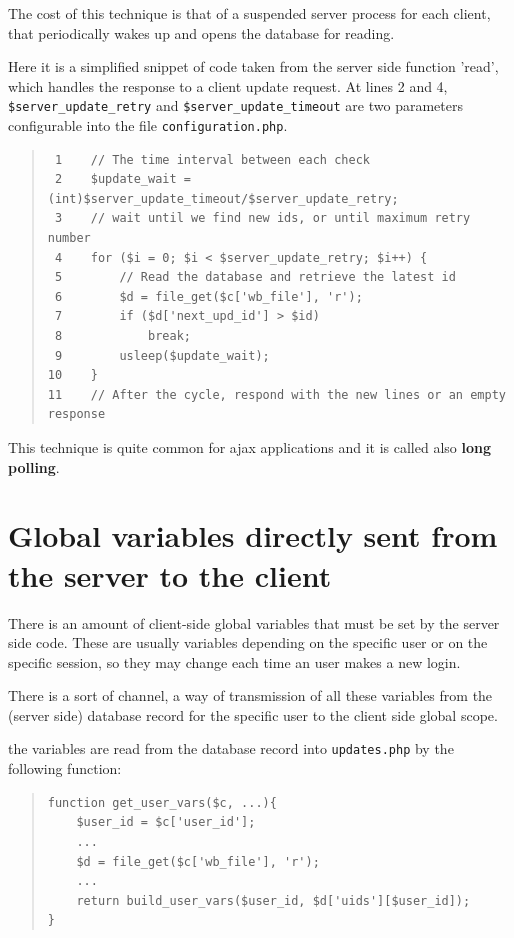 \documentclass[10pt,a4paper,english]{book}
\begin{document}
The cost of this technique is that of a suspended server process for
each client, that periodically wakes up and opens the database for
reading.

Here it is a simplified snippet of code taken from the server side
function 'read', which handles the response to a client update
request. At lines 2 and 4, \texttt{{\$}server{\_}update{\_}retry} and
\texttt{{\$}server{\_}update{\_}timeout} are two parameters configurable into the
file \texttt{configuration.php}.
\begin{quote}\begin{verbatim}
 1    // The time interval between each check
 2    $update_wait = (int)$server_update_timeout/$server_update_retry;
 3    // wait until we find new ids, or until maximum retry number
 4    for ($i = 0; $i < $server_update_retry; $i++) {
 5        // Read the database and retrieve the latest id
 6        $d = file_get($c['wb_file'], 'r');
 7        if ($d['next_upd_id'] > $id)
 8            break;
 9        usleep($update_wait);
10    }
11    // After the cycle, respond with the new lines or an empty response
\end{verbatim}
\end{quote}

This technique is quite common for ajax applications and it is called
also \textbf{long polling}.



\hypertarget{global-variables-directly-sent-from-the-server-to-the-client}{}
\section{Global variables directly sent from the server to the client}
\label{global-variables-directly-sent-from-the-server-to-the-client}

There is an amount of client-side global variables that must be set
by the server side code. These are usually variables depending on the
specific user or on the specific session, so they may change each time
an user makes a new login.

There is a sort of channel, a way of transmission of all these
variables from the (server side) database record for the specific user
to the client side global scope.

the variables are read from the database record into \texttt{updates.php}
by the following function:
\begin{quote}\begin{verbatim}
function get_user_vars($c, ...){
    $user_id = $c['user_id'];
    ...
    $d = file_get($c['wb_file'], 'r');
    ...
    return build_user_vars($user_id, $d['uids'][$user_id]);
}
\end{verbatim}
\end{quote}
\end{document}
